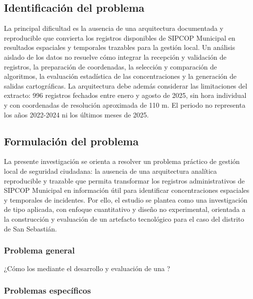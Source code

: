 \subsection{Identificación del problema}

La principal dificultad es la ausencia de una arquitectura documentada y reproducible que convierta los registros disponibles de SIPCOP Municipal en resultados espaciales y temporales trazables para la gestión local. Un análisis aislado de los datos no resuelve cómo integrar la recepción y validación de registros, la preparación de coordenadas, la selección y comparación de algoritmos, la evaluación estadística de las concentraciones y la generación de salidas cartográficas. La arquitectura debe además considerar las limitaciones del extracto: 996 registros fechados entre enero y agosto de 2025, sin hora individual y con coordenadas de resolución aproximada de 110 m. El periodo no representa los años 2022-2024 ni los últimos meses de 2025.

\subsection{Formulación del problema}

La presente investigación se orienta a resolver un problema práctico de gestión local de seguridad ciudadana: la ausencia de una arquitectura analítica reproducible y trazable que permita transformar los registros administrativos de SIPCOP Municipal en información útil para identificar concentraciones espaciales y temporales de incidentes. Por ello, el estudio se plantea como una investigación de tipo aplicada, con enfoque cuantitativo y diseño no experimental, orientada a la construcción y evaluación de un artefacto tecnológico para el caso del distrito de San Sebastián.

\subsubsection{Problema general}

¿Cómo  los  mediante el desarrollo y evaluación de una ?

\subsubsection{Problemas específicos}

